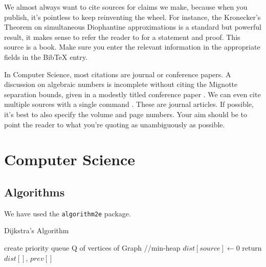 \documentclass[a4paper]{article}
\begin{document}
\noindent
We almost always want to cite sources for claims we make, because when you publish, it's pointless to keep reinventing the wheel. For instance, the Kronecker's Theorem on simultaneous Diophantine
approximations is a standard but powerful result, it makes sense to refer the reader to \cite[Chap. 7, Sec. 1.3, Prop. 7]{citation2} for a statement and proof. This source is a book. Make sure you enter the relevant information in the appropriate fields in the BibTeX entry.\par\medskip
In Computer Science, most citations are journal or conference papers. A discussion on algebraic numbers is incomplete without citing the Mignotte separation bounds, given in a modestly titled conference paper \cite{citation3}. We can even cite multiple sources with a single command \cite{citation1,citation4}. These are
journal articles. If possible, it's best to also specify the volume and page numbers. Your aim should be to point the reader to what you're quoting as unambiguously as possible.

\newpage
\section{Computer Science}
\subsection{Algorithms}
We have used the \verb!algorithm2e! package.

\DecMargin{1.5em}
\begin{algorithm}[h]
    \caption{Dijkstra’s Algorithm}
    \SetAlgoLined
    \DontPrintSemicolon
    create priority queue Q of vertices of Graph //min-heap\;
    $dist[source] \leftarrow 0$\;
    return $dist[]$, $prev[]$\;
\end{algorithm}
\IncMargin{1.5em}
\end{document}
